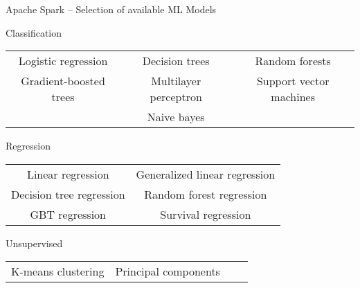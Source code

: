 \documentclass[ignorenonframetext,xcolor=x11names]{beamer}
\begin{document}
\begin{frame}{Apache Spark -- Selection of available ML Models}
\begin{block}{\small Classification}
\begin{center}
\renewcommand{\arraystretch}{1.5}
\footnotesize
\begin{tabular}{ccc} 
Logistic regression & Decision trees & Random forests \\
Gradient-boosted trees & Multilayer perceptron & Support vector machines \\
& Naive bayes
\end{tabular}
\end{center}
\end{block}
\begin{block}{\small Regression}
\begin{center}
\renewcommand{\arraystretch}{1.5}
\footnotesize
\begin{tabular}{cc} 
Linear regression & Generalized linear regression \\
Decision tree regression & Random forest regression \\
GBT regression & Survival regression \\
\end{tabular}
\end{center}
\end{block}
\begin{block}{\small Unsupervised}
\begin{center}
\renewcommand{\arraystretch}{1.5}
\footnotesize
\begin{tabular}{cccc} 
K-means clustering & Principal components \\
\end{tabular}
\end{center}
\end{block}
\end{frame}


\end{document}
